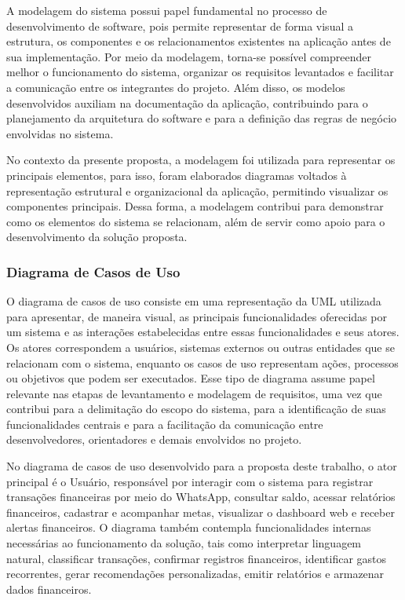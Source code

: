 A modelagem do sistema possui papel fundamental no processo de desenvolvimento de software, pois permite representar de forma visual a estrutura, os componentes e os relacionamentos existentes na aplicação antes de sua implementação. Por meio da modelagem, torna-se possível compreender melhor o funcionamento do sistema, organizar os requisitos levantados e facilitar a comunicação entre os integrantes do projeto. Além disso, os modelos desenvolvidos auxiliam na documentação da aplicação, contribuindo para o planejamento da arquitetura do software e para a definição das regras de negócio envolvidas no sistema.

No contexto da presente proposta, a modelagem foi utilizada para representar os principais elementos, para isso, foram elaborados diagramas voltados à representação estrutural e organizacional da aplicação, permitindo visualizar os componentes principais. Dessa forma, a modelagem contribui para demonstrar como os elementos do sistema se relacionam, além de servir como apoio para o desenvolvimento da solução proposta.

\subsubsection{Diagrama de Casos de Uso}

O diagrama de casos de uso consiste em uma representação da UML utilizada para apresentar, de maneira visual, as principais funcionalidades oferecidas por um sistema e as interações estabelecidas entre essas funcionalidades e seus atores. Os atores correspondem a usuários, sistemas externos ou outras entidades que se relacionam com o sistema, enquanto os casos de uso representam ações, processos ou objetivos que podem ser executados. Esse tipo de diagrama assume papel relevante nas etapas de levantamento e modelagem de requisitos, uma vez que contribui para a delimitação do escopo do sistema, para a identificação de suas funcionalidades centrais e para a facilitação da comunicação entre desenvolvedores, orientadores e demais envolvidos no projeto.

No diagrama de casos de uso desenvolvido para a proposta deste trabalho, o ator principal é o Usuário, responsável por interagir com o sistema para registrar transações financeiras por meio do WhatsApp, consultar saldo, acessar relatórios financeiros, cadastrar e acompanhar metas, visualizar o dashboard web e receber alertas financeiros. O diagrama também contempla funcionalidades internas necessárias ao funcionamento da solução, tais como interpretar linguagem natural, classificar transações, confirmar registros financeiros, identificar gastos recorrentes, gerar recomendações personalizadas, emitir relatórios e armazenar dados financeiros.

